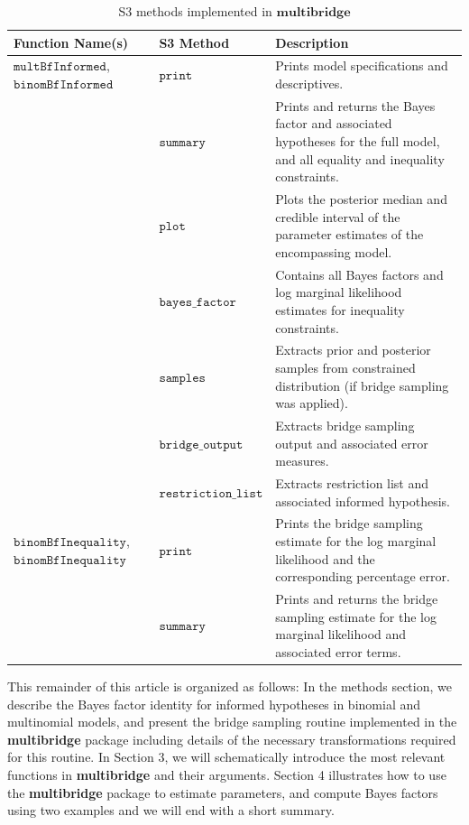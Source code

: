 \documentclass[
  english,
  man,floatsintext]{apa6}
\begin{document}
\begin{table}
\caption {S3 methods implemented in $\textbf{multibridge}$}
\label{table:s3_methods}
\begin{center}
\begin{tabular}{p{4cm}p{3.5cm}p{9cm}}
        \toprule
Function Name(s) & S3 Method & Description \\\midrule
$\texttt{multBfInformed}$, $\texttt{binomBfInformed}$ & $\texttt{print}$ & Prints model specifications and descriptives. \\
 & $\texttt{summary}$ &  Prints and returns the Bayes factor and associated hypotheses for the full model, and all equality and inequality constraints.\\
  & $\texttt{plot}$ &  Plots the posterior median and credible interval of the parameter estimates of the encompassing model.\\
 & $\texttt{bayes\_factor}$ & Contains all Bayes factors and log marginal likelihood estimates for inequality constraints.\\
 & $\texttt{samples}$ & Extracts prior and posterior samples from constrained distribution (if bridge sampling was applied). \\
& $\texttt{bridge\_output}$    &  Extracts bridge sampling output and associated error measures.\\
& $\texttt{restriction\_list}$ & Extracts restriction list and associated informed hypothesis. \\
$\texttt{binomBfInequality}$, $\texttt{binomBfInequality}$  & $\texttt{print}$ & Prints the bridge sampling estimate for the log marginal likelihood and the corresponding percentage error. \\
& $\texttt{summary}$ & Prints and returns the bridge sampling estimate for the log marginal likelihood and associated error terms.\\
\bottomrule
\end{tabular}
\end{center}
\end{table}

This remainder of this article is organized as follows: In the methods section, we describe the Bayes factor identity for informed hypotheses in binomial and multinomial models, and present the bridge sampling routine implemented in the \textbf{multibridge} package including details of the necessary transformations required for this routine. In Section 3, we will schematically introduce the most relevant functions in \textbf{multibridge} and their arguments. Section 4 illustrates how to use the \textbf{multibridge} package to estimate parameters, and compute Bayes factors using two examples and we will end with a short summary.
\end{document}

